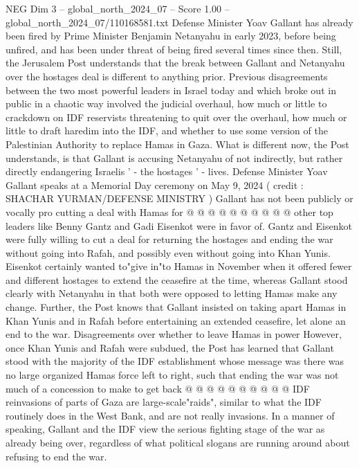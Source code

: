 \begin{textsample}{NEG Dim 3 – global\_north\_2024\_07 – Score 1.00 – global\_north\_2024\_07/110168581.txt}  \label{ex:f3_neg_376}
Defense Minister Yoav Gallant has already been fired by Prime Minister Benjamin Netanyahu in early 2023, before being unfired, and has been under threat of being fired several times since then.
Still, the Jerusalem Post understands that the break between Gallant and Netanyahu over the hostages deal is different to anything prior.
Previous disagreements between the two most powerful leaders in Israel today and which broke out in public in a chaotic way involved the judicial overhaul, how much or little to crackdown on IDF reservists threatening to quit over the overhaul, how much or little to draft haredim into the IDF, and whether to use some version of the Palestinian Authority to replace Hamas in Gaza.
What is different now, the Post understands, is that Gallant is accusing Netanyahu of not indirectly, but rather directly endangering Israelis ' - the hostages ' - lives.
Defense Minister Yoav Gallant speaks at a Memorial Day ceremony on May 9, 2024 ( credit : SHACHAR YURMAN/DEFENSE MINISTRY ) Gallant has not been publicly or vocally pro cutting a deal with Hamas for @ @ @ @ @ @ @ @ @ @ other top leaders like Benny Gantz and Gadi Eisenkot were in favor of.
Gantz and Eisenkot were fully willing to cut a deal for returning the hostages and ending the war without going into Rafah, and possibly even without going into Khan Yunis.
Eisenkot certainly wanted to"give in"to Hamas in November when it offered fewer and different hostages to extend the ceasefire at the time, whereas Gallant stood clearly with Netanyahu in that both were opposed to letting Hamas make any change.
Further, the Post knows that Gallant insisted on taking apart Hamas in Khan Yunis and in Rafah before entertaining an extended ceasefire, let alone an end to the war.
Disagreements over whether to leave Hamas in power However, once Khan Yunis and Rafah were subdued, the Post has learned that Gallant stood with the majority of the IDF establishment whose message was there was no large organized Hamas force left to right, such that ending the war was not much of a concession to make to get back @ @ @ @ @ @ @ @ @ @ IDF reinvasions of parts of Gaza are large-scale"raids", similar to what the IDF routinely does in the West Bank, and are not really invasions.
In a manner of speaking, Gallant and the IDF view the serious fighting stage of the war as already being over, regardless of what political slogans are running around about refusing to end the war.

\end{textsample}
